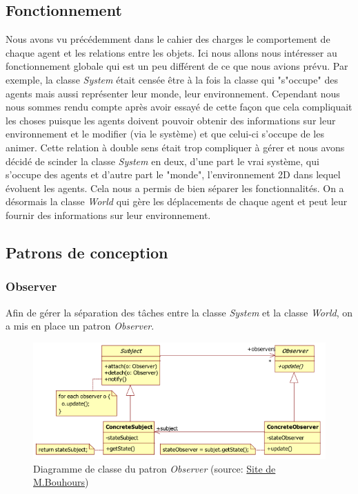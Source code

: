 \documentclass{article}
\begin{document}
\subsection{Fonctionnement}
Nous avons vu précédemment dans le cahier des charges le comportement de chaque agent et les relations entre les objets.
Ici nous allons nous intéresser au fonctionnement globale qui est un peu différent de ce que nous avions prévu. Par exemple,
la classe \emph{System} était censée être à la fois la classe qui "s"occupe" des agents mais aussi représenter leur
monde, leur environnement. Cependant nous nous sommes rendu compte après avoir essayé de cette façon que cela compliquait
les choses puisque les agents doivent pouvoir obtenir des informations sur leur environnement et le modifier (via le système) et que
celui-ci s'occupe de les animer. Cette relation à double sens était trop compliquer à gérer et nous avons décidé de scinder
la classe \emph{System} en deux, d'une part le vrai système, qui s'occupe des agents et d'autre part le "monde", l'environnement
2D dans lequel évoluent les agents. Cela nous a permis de bien séparer les fonctionnalités.
On a désormais la classe \emph{World} qui gère les déplacements de chaque agent et peut leur fournir
des informations sur leur environnement.

\subsection{Patrons de conception}
\subsubsection{Observer}
Afin de gérer la séparation des tâches entre la classe \emph{System} et la classe \emph{World},
on a mis en place un patron \emph{Observer}.
\begin{figure}[!h]
  \centering
  \caption{Diagramme de classe du patron \emph{Observer} (source: \href{http://www.goprod.bouhours.net/?page=pattern&pat_id=16}{Site de M.Bouhours})}
  \includegraphics[scale=0.7]{img/observer.png}
\end{figure}
\end{document}
